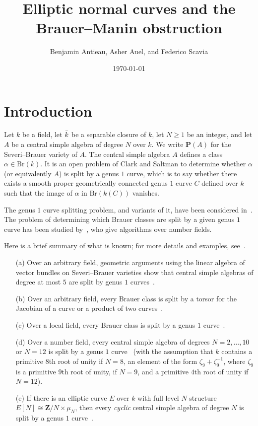 \documentclass[10pt,letterpaper,twoside]{article}
\title{Elliptic normal curves and the Brauer--Manin obstruction}
\author{Benjamin Antieau, Asher Auel, and Federico Scavia}
\date{\today}
\renewcommand{\1}{\mathbf{1}}
\newcommand{\bP}{\mathbf{P}}
\newcommand{\bZ}{\mathbf{Z}}
\renewcommand{\geq}{\geqslant}
\newcommand{\Br}{\mathrm{Br}}
\newcommand{\iso}{\cong}
\theoremstyle{plain}
\theoremstyle{plain}
\theoremstyle{definition}
\theoremstyle{named}
\theoremstyle{definition}
\begin{document}
\maketitle
\tableofcontents



\section{Introduction}

Let $k$ be a field, let $\Bar{k}$ be a separable closure of $k$, let $N\geq 1$ be an integer, and
let $A$ be a central simple algebra of degree $N$ over $k$. We write $\bP(A)$ for the Severi--Brauer
variety of $A$. The central simple algebra $A$ defines a class $\alpha\in\Br(k)$. It is an open
problem of Clark and Saltman to determine whether $\alpha$ (or equivalently $A$) is split by a genus $1$ curve, which is
to say whether there exists a smooth proper geometrically connected genus $1$ curve $C$ defined over
$k$ such that the image of $\alpha$ in $\Br(k(C))$ vanishes.

The genus $1$ curve splitting problem, and variants of it, have been considered
in~\cite{dejong-ho,ho-lieblich,antieau-auel,saltman-genus,huybrechts-mattei}. The problem of determining
which Brauer classes are split by a given genus $1$ curve has been studied
by~\cite{ciperiani-krashen}, who give algorithms over number fields.

Here is a brief summary of what is known; for more details and examples, see~\cite{antieau-auel}.
\begin{enumerate}
    \item[(a)] Over an arbitrary field, geometric arguments using the linear algebra of vector
        bundles on Severi--Brauer varieties show that central simple algebras of
        degree at most $5$ are split by genus $1$ curves~\cite{dejong-ho}.
    \item[(b)] Over an arbitrary field, every Brauer class is split by a torsor for the Jacobian of
        a curve or a product of two curves~\cite{ho-lieblich}.
    \item[(c)] Over a local field, every Brauer class is split by a genus $1$ curve~\cite[Ex.~2.4]{antieau-auel}.
    \item[(d)] Over a number field, every central simple algebra of degrees $N=2,\ldots,10$ or $N=12$ is split
        by a genus $1$ curve~\cite{antieau-auel} (with the assumption that $k$ contains a primitive $8$th root of unity
        if $N=8$, an element of the form $\zeta_9+\zeta_9^{-1}$, where $\zeta_9$ is a primitive
        $9$th root of unity, if $N=9$, and a primitive $4$th root of unity if $N=12$).
    \item[(e)] If there is an elliptic curve $E$ over $k$ with full level $N$ structure
        $E[N]\iso\bZ/N\times\mu_N$, then every {\em cyclic} central simple algebra of degree $N$ is
        split by a genus $1$ curve~\cite{antieau-auel}.
\end{enumerate}
\end{document}
